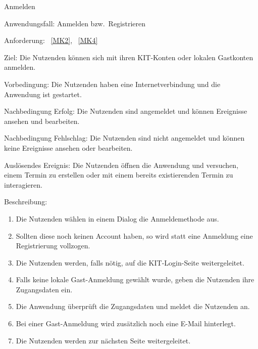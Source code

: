 \begin{function}{20}{Anmelden}
    \item[Anwendungsfall:] Anmelden bzw.\ Registrieren
    \item[Anforderung:]~\ref{MK2}, ~\ref{MK4}
    \item[Ziel:] Die Nutzenden können sich mit ihren KIT-Konten oder lokalen Gastkonten anmelden.
    \item[Vorbedingung:] Die Nutzenden haben eine Internetverbindung und die Anwendung ist gestartet.
    \item[Nachbedingung Erfolg:] Die Nutzenden sind angemeldet und können Ereignisse ansehen und bearbeiten.
    \item[Nachbedingung Fehlschlag:] Die Nutzenden sind nicht angemeldet und können keine Ereignisse ansehen oder bearbeiten.
    \item[Auslösendes Ereignis:] Die Nutzenden öffnen die Anwendung und versuchen, einem Termin zu erstellen oder mit einem bereits existierenden Termin zu interagieren.
    \item[Beschreibung:] ~
    \begin{enumerate}
        \item Die Nutzenden wählen in einem Dialog die Anmeldemethode aus.
        \item Sollten diese noch keinen Account haben, so wird statt eine Anmeldung eine Registrierung vollzogen.
        \item Die Nutzenden werden, falls nötig, auf die KIT-Login-Seite weitergeleitet.
        \item Falls keine lokale Gast-Anmeldung gewählt wurde, geben die Nutzenden ihre Zugangsdaten ein.
        \item Die Anwendung überprüft die Zugangsdaten und meldet die Nutzenden an.
        \item Bei einer Gast-Anmeldung wird zusätzlich noch eine E-Mail hinterlegt.
        \item Die Nutzenden werden zur nächsten Seite weitergeleitet.
    \end{enumerate}
\end{function}

\pagebreak

